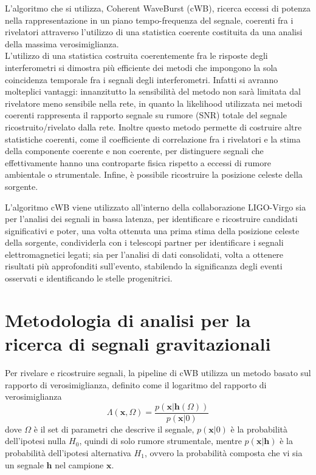 L'algoritmo che si utilizza, Coherent WaveBurst (cWB), ricerca eccessi di potenza nella rappresentazione in un piano tempo-frequenza del segnale, coerenti fra i rivelatori attraverso l'utilizzo di una statistica coerente costituita da una analisi della massima verosimiglianza.\\
L'utilizzo di una statistica costruita coerentemente fra le risposte degli interferometri si dimostra più efficiente dei metodi che impongono la sola coincidenza temporale fra i segnali degli interferometri. Infatti si avranno molteplici vantaggi: innanzitutto la sensibilità del metodo non sarà limitata dal rivelatore meno sensibile nella rete, in quanto la likelihood utilizzata nei metodi coerenti rappresenta il rapporto segnale su rumore (SNR) totale del segnale ricostruito/rivelato dalla rete. 
Inoltre questo metodo permette di costruire altre statistiche coerenti, come il coefficiente di correlazione fra i rivelatori e la stima della componente coerente e non coerente, per distinguere segnali che effettivamente hanno una controparte fisica rispetto a eccessi di rumore ambientale o strumentale. Infine, è possibile ricostruire la posizione celeste della sorgente\cite{Klimenko_2008}.

L'algoritmo cWB viene utilizzato all'interno della collaborazione LIGO-Virgo sia per l'analisi dei segnali in bassa latenza, per identificare e ricostruire candidati significativi e poter, una volta ottenuta una prima stima della posizione celeste della sorgente, condividerla con i telescopi partner per identificare i segnali elettromagnetici legati; sia per l'analisi di dati consolidati, volta a ottenere risultati più approfonditi sull'evento, stabilendo la significanza degli eventi osservati e identificando le stelle progenitrici\cite{Klimenko_2016}.
\section{Metodologia di analisi per la ricerca di segnali gravitazionali}
\label{section:coherent_analysis}
Per rivelare e ricostruire segnali, la pipeline di cWB utilizza un metodo basato sul rapporto di verosimiglianza, definito come il logaritmo del rapporto di verosimiglianza
\begin{equation}
	\Lambda(\mathbf{x},\Omega) = \frac{p(\mathbf{x}|\mathbf{h}(\Omega))}{p(\mathbf{x}|0)}
\end{equation}
dove $\Omega$ è il set di parametri che descrive il segnale, $p(\mathbf{x}|0)$ è la probabilità dell'ipotesi nulla $H_0$, quindi di solo rumore strumentale, mentre $p(\mathbf{x}|\mathbf{h})$ è la probabilità dell'ipotesi alternativa $H_1$, ovvero la probabilità composta che vi sia un segnale $\mathbf{h}$ nel campione $\mathbf{x}$\cite{Klimenko_2016}.


